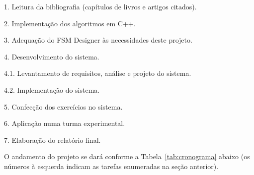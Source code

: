\documentclass[
	12pt,				%
	openany,
	oneside,
	a4paper,			%
	english,			%
	brazil,				%
	]{abntex2}
\begin{document}
\begin{alineas}

	\item[1.] Leitura da bibliografia (capítulos de livros e artigos citados).
	\item[2.] Implementação dos algoritmos em C++.
	\item[3.] Adequação do FSM Designer às necessidades deste projeto.
    \item[4.] Desenvolvimento do sistema.
	\begin{alineas}
		\item[4.1.] Levantamento de requisitos, análise e projeto do sistema.
		\item[4.2.] Implementação do sistema.
	\end{alineas}
	\item[5.] Confecção dos exercícios no sistema.
	\item[6.] Aplicação numa turma experimental.
	\item[7.] Elaboração do relatório final.
\end{alineas}


O andamento do projeto se dará conforme a Tabela~\ref{tab:cronograma} abaixo (os números à esquerda indicam as tarefas enumeradas na seção anterior). 
\end{document}
